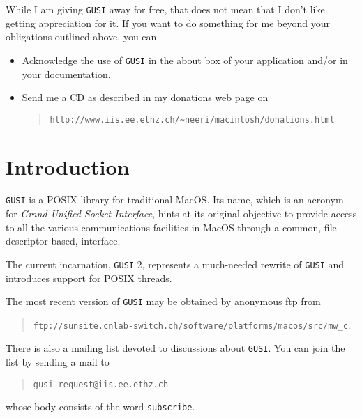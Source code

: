 \documentclass[a4paper,dvips]{book}
\newcommand{\clearemptydoublepage}{\newpage{\pagestyle{empty}\cleardoublepage}}
\begin{document}
While I am giving \texttt{GUSI} away for free, that does not mean that I don't like 
getting appreciation for it. If you want to do something for me beyond your
obligations outlined above, you can

\begin{itemize}
\item Acknowledge the use of  \texttt{GUSI} in the about box of your application and/or in
  your documentation.
\item \href{http://www.iis.ee.ethz.ch/~neeri/macintosh/donations.html}{Send me a CD} as described in 
  my donations web page on
\begin{quotation}
  \verb|http://www.iis.ee.ethz.ch/~neeri/macintosh/donations.html|
\end{quotation}
\end{itemize}

%
%
\cleardoublepage
{}
\tableofcontents

%
%
\clearemptydoublepage
\mainmatter
\raggedright
\setcounter{chapter}{0}%

\chapter{Introduction}

\texttt{GUSI} is a POSIX library for traditional MacOS. Its name, which is an
acronym for \textit{Grand Unified Socket Interface}, hints at its original objective to 
provide access to all the various communications facilities in MacOS through a
common, file descriptor based, interface.

The current incarnation, \texttt{GUSI} 2, represents a 
much-needed rewrite of \texttt{GUSI} and introduces support for POSIX threads.

The most recent version of \texttt{GUSI} may be obtained by anonymous ftp from 
\begin{quotation}
\verb|ftp://sunsite.cnlab-switch.ch/software/platforms/macos/src/mw_c|.
\end{quotation}

There is also a mailing list devoted to discussions about \texttt{GUSI}. You can join the
list by sending a mail to 

\begin{quotation}
\verb|gusi-request@iis.ee.ethz.ch| 
\end{quotation}

whose body consists of the word \texttt{subscribe}.
\end{document}
